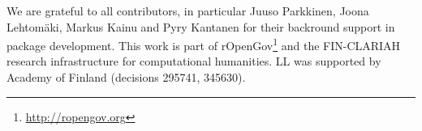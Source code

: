We are grateful to all contributors, in particular Juuso Parkkinen, Joona Lehtomäki, Markus Kainu and Pyry Kantanen for their backround support in package development. This work is part of rOpenGov\footnote{\url{http://ropengov.org}} and the FIN-CLARIAH research infrastructure for computational humanities. LL was supported by Academy of Finland (decisions 295741, 345630).




\address{Måns Magnusson\\
  Department of Statistics\\
  Uppsala University\\
  Sweden\\
  ORCiD: 0000-0002-0296-2719\\
  }

\address{Leo Lahti\\
  Department of Computing\\
  PO Box 20014 University of Turku\\
  Finland\\
  ORCiD: 0000-0001-5537-637X\\
  }









